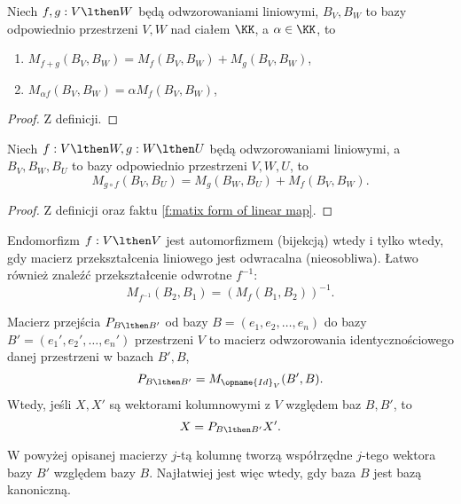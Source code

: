 \begin{theorem}
    Niech $f, g : V \lthen W$ będą odwzorowaniami liniowymi, $B_V, B_W$ to bazy odpowiednio przestrzeni $V, W$ nad ciałem $\KK$, a $\alpha \in \KK$, to
    \begin{enumerate}
        \item $M_{f+g}(B_V, B_W) = M_f(B_V, B_W) + M_g(B_V, B_W)$,
        \item $M_{\alpha f}(B_V, B_W) = \alpha M_f(B_V, B_W)$,
    \end{enumerate}
\end{theorem}
\begin{proof}
    Z definicji.
\end{proof}

\begin{theorem}
    Niech $f : V \lthen W, g : W \lthen U$ będą odwzorowaniami liniowymi, a $B_V, B_W, B_U$ to bazy odpowiednio przestrzeni $V, W, U$, to
    \[ M_{g\circ f}(B_V, B_U) = M_g(B_W, B_U) + M_f(B_V, B_W). \]
\end{theorem}
\begin{proof}
    Z definicji oraz faktu \ref{f:matix form of linear map}.
\end{proof}

\begin{corollary}
    Endomorfizm $f : V \lthen V$ jest automorfizmem (bijekcją) wtedy i tylko wtedy, gdy macierz przekształcenia liniowego jest odwracalna (nieosobliwa). Łatwo również znaleźć przekształcenie odwrotne $f^{-1}$:
    \[ M_{f^{-1}}(B_2, B_1) = (M_f(B_1, B_2))^{-1}. \]
\end{corollary}

\begin{definition}
    Macierz przejścia $P_{B \lthen B'}$ od bazy $B = (e_1, e_2, \ldots, e_n)$ do bazy $B' = (e_1', e_2', \ldots, e_n')$ przestrzeni $V$ to macierz odwzorowania identycznościowego danej przestrzeni w bazach $B', B$,
    \[ P_{B\lthen B'} = M_{\opname{Id}_V}(B', B). \]
    Wtedy, jeśli $X, X'$ są wektorami kolumnowymi z $V$ względem baz $B, B'$, to
    \[ X = P_{B \lthen B'}X'. \]
\end{definition}

\begin{remark*}
    W powyżej opisanej macierzy $j$-tą kolumnę tworzą współrzędne $j$-tego wektora bazy $B'$ względem bazy $B$. Najłatwiej jest więc wtedy, gdy baza $B$ jest bazą kanoniczną.
\end{remark*}

